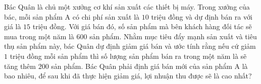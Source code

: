 \begin{ex}%
	Bác Quân là chủ một xưởng cơ khí sản xuất các thiết bị máy. Trong xưởng của bác, mỗi sản phẩm A có chi phí sản xuất là $10$ triệu đồng và dự định bán ra với giá là $15$ triệu đồng. Với giá bán đó, số sản phẩm mà bên khách hàng đối tác sẽ mua trong một năm là $600$ sản phẩm. Nhằm mục tiêu đẩy mạnh sản xuất và tiêu thụ sản phẩm này, bác Quân dự định giảm giá bán và ước tính rằng nếu cứ giảm $1$ triệu đồng mỗi sản phẩm thì số lượng sản phẩm bán ra trong một năm là sẽ tăng thêm $200$ sản phẩm. Bác Quân phải định giá bán mới của sản phẩm A là bao nhiêu, để sau khi đã thực hiện giảm giá, lợi nhuận thu được sẽ là cao nhất?
\end{ex}






